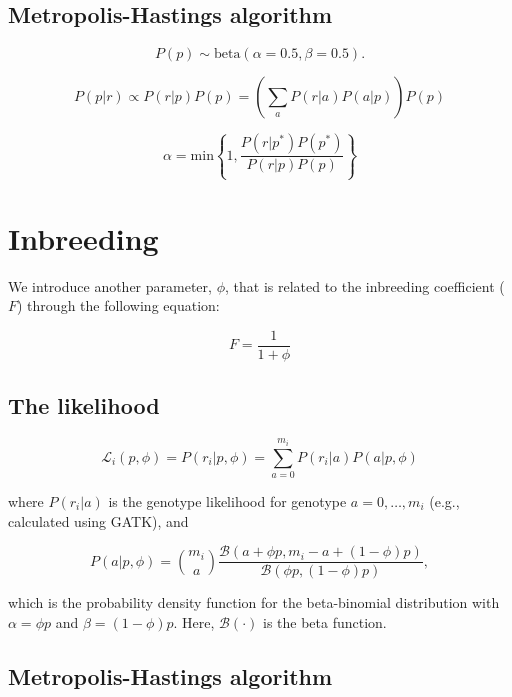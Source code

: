 \documentclass[11pt,english,letterpaper,oneside]{article}
\begin{document}
\subsection{Metropolis-Hastings algorithm}

\begin{equation}
P(p) \sim \text{beta}(\alpha = 0.5, \beta = 0.5).
\end{equation}

\begin{equation}
P(p|r) \propto P(r|p)P(p) = \left(\sum_a P(r|a)P(a|p)\right)P(p)
\end{equation}

\begin{equation}
\alpha = \text{min} \left\{1, \frac{P(r|p^*)P(p^*)}{P(r|p)P(p)} \right\}
\end{equation}

\section{Inbreeding}

We introduce another parameter, $\phi$, that is related to the inbreeding coefficient ($F$) through the following equation:

\begin{equation}
F = \frac{1}{1 + \phi}
\end{equation}

\subsection{The likelihood}

\begin{equation}
\mathcal{L}_i(p,\phi) = P(r_i|p,\phi) = \sum_{a=0}^{m_i} P(r_i|a)P(a|p,\phi)
\end{equation}

where $P(r_i|a)$ is the genotype likelihood for genotype $a = 0,\dots,m_i$ (e.g., calculated using GATK), and 

\begin{equation*}
P(a | p,\phi) = \binom{m_i}{a} \frac{\mathcal{B}(a + \phi{}p, m_i - a + (1 - \phi)p)}{\mathcal{B}(\phi{}p, (1-\phi)p)},
\end{equation*}

which is the probability density function for the beta-binomial distribution with $\alpha = \phi{}p$ and $\beta = (1 - \phi)p$. Here, $\mathcal{B}(\cdot)$ is the beta function.

\subsection{Metropolis-Hastings algorithm}
\end{document}

